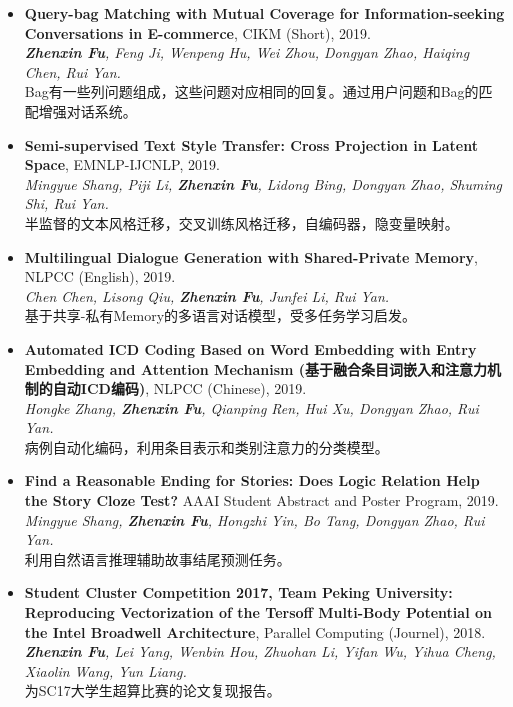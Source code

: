 \documentclass[letterpaper]{article}
\begin{document}
\begin{itemize}

\item \textbf{Query-bag Matching with Mutual Coverage for Information-seeking Conversations in E-commerce}, CIKM (Short), 2019. \\
{\it \textbf{Zhenxin Fu}, Feng Ji, Wenpeng Hu, Wei Zhou, Dongyan Zhao, Haiqing Chen, Rui Yan. } \\
Bag有一些列问题组成，这些问题对应相同的回复。通过用户问题和Bag的匹配增强对话系统。

\item \textbf{Semi-supervised Text Style Transfer: Cross Projection in Latent Space}, EMNLP-IJCNLP, 2019. \\
{\it Mingyue Shang, Piji Li, \textbf{Zhenxin Fu}, Lidong Bing, Dongyan Zhao, Shuming Shi, Rui Yan.} \\
半监督的文本风格迁移，交叉训练风格迁移，自编码器，隐变量映射。

\item \textbf{Multilingual Dialogue Generation with Shared-Private Memory}, NLPCC (English), 2019. \\
{\it Chen Chen, Lisong Qiu, \textbf{Zhenxin Fu}, Junfei Li, Rui Yan. } \\
基于共享-私有Memory的多语言对话模型，受多任务学习启发。

\item \textbf{Automated ICD Coding Based on Word Embedding with Entry Embedding and Attention Mechanism (基于融合条目词嵌入和注意力机制的自动ICD编码)}, NLPCC (Chinese), 2019. \\
{\it Hongke Zhang, \textbf{Zhenxin Fu}, Qianping Ren, Hui Xu, Dongyan Zhao, Rui Yan.} \\
病例自动化编码，利用条目表示和类别注意力的分类模型。

\item \textbf{Find a Reasonable Ending for Stories: Does Logic Relation Help the Story Cloze Test?} AAAI Student Abstract and Poster Program, 2019. \\
{\it Mingyue Shang, \textbf{Zhenxin Fu}, Hongzhi Yin, Bo Tang, Dongyan Zhao, Rui Yan.} \\
利用自然语言推理辅助故事结尾预测任务。

\item \textbf{Student Cluster Competition 2017, Team Peking University: Reproducing Vectorization of the Tersoff Multi-Body Potential on the Intel Broadwell Architecture}, Parallel Computing (Journel), 2018. \\
{\it \textbf{Zhenxin Fu}, Lei Yang, Wenbin Hou, Zhuohan Li, Yifan Wu, Yihua Cheng, Xiaolin Wang, Yun Liang.} \\
为SC17大学生超算比赛的论文复现报告。


\end{itemize}
\end{document}
